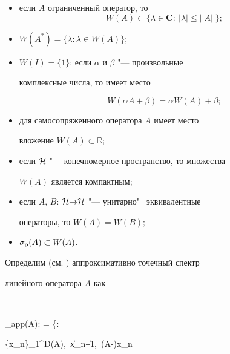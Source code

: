 \begin{itemize}



\item[1)] если $A$ ограниченный оператор, то $$W(A) \subset

\{\lambda \in \mathbf{C}: \ |\lambda| \leq ||A||\};$$



\item[2)] $W(A^*)=\{\overline{\lambda}:  \lambda \in W(A)\}$;



\item[3)] $W(I)=\{1\}$; если $\alpha$ и $\beta$ "--- произвольные

комплексные числа, то имеет место

$$

W(\alpha A+ \beta)=\alpha W(A)+ \beta;

$$



\item[4)] для самосопряженного оператора $A$ имеет место

вложение $W(A) \subset \mathbb R$;



\item[5)] если ${\cal H}$ "--- конечномерное пространство, то множества

$W(A)$ является компактным;



\item[6)] если $A$, $B$: ${\cal H} {\to} {\cal H}$ "--- унитарно"=эквивалентные

операторы, то \mbox{$W(A){=}W(B);$}



\item[7)] $\sigma_{\rm p}(A) \subset W(A)$.





\end{itemize}



Определим (см. \cite{RD:bib:RS-4}) аппроксимативно точечный спектр

линейного оператора $A$ как

$$

\sigma_{\rm app}(A): = \{\lambda {}: \exists

\{x_n\}_1^\infty \subset D(A),\, \|x_n\|=1,\, (A-\lambda)x_n \to

